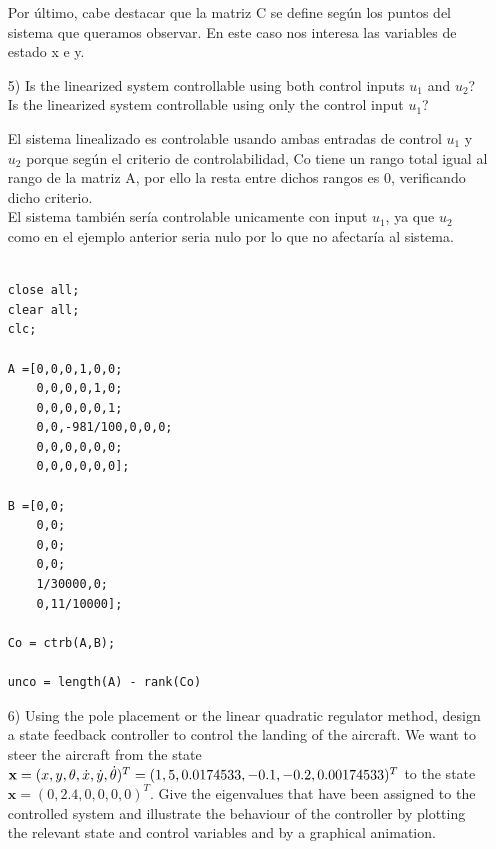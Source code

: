 \documentclass{article}
\begin{document}
\begin{itemize}
Por último, cabe destacar que la matriz C se define según los puntos del sistema que queramos observar. En este caso nos interesa las variables de estado x e y.

\bigskip

\item[5)] 
{\color{gray}
Is the linearized system controllable using both control inputs  $u_1$ and $u_2$? 
Is the linearized system controllable using only the control input $u_1$? 
}

\bigskip

El sistema linealizado es controlable usando ambas entradas de control $u_1$ y $u_2$ porque según el criterio de controlabilidad, Co tiene un rango total igual al rango de la matriz A, por ello la resta entre dichos rangos es 0, verificando dicho criterio.\\

El sistema también sería controlable unicamente con input $u_1$, ya que $u_2$ como en el ejemplo anterior seria nulo por lo que no afectaría al sistema.

\bigskip


\begin{tcolorbox}
[
title={File \texttt{answer\_5.m}}    
]
\begin{scriptsize}
\begin{verbatim}

close all;
clear all;
clc;

A =[0,0,0,1,0,0;
    0,0,0,0,1,0;
    0,0,0,0,0,1;
    0,0,-981/100,0,0,0;
    0,0,0,0,0,0;
    0,0,0,0,0,0];

B =[0,0;
    0,0;
    0,0;
    0,0;
    1/30000,0;
    0,11/10000];

Co = ctrb(A,B);

unco = length(A) - rank(Co)

\end{verbatim}
\end{scriptsize}
\end{tcolorbox}

\item[6)] 
{\color{gray}
Using the pole placement or the linear quadratic regulator method, design a state feedback controller to control the landing of the aircraft. 
We want to steer the aircraft from the state $\mathbf{x} = (x, y, \theta, \dot{x}, \dot{y}, \dot{\theta})^T = (1,5,0.0174533,-0.1,\linebreak -0.2,0.00174533)^T$ to the state $\mathbf{x} = (0, 2.4, 0, 0, 0, 0)^T$. 
Give the eigenvalues that have been assigned to the controlled system and illustrate the behaviour of the controller by plotting the relevant state and control variables and by a graphical animation. 
}


\end{itemize}
\end{document}
